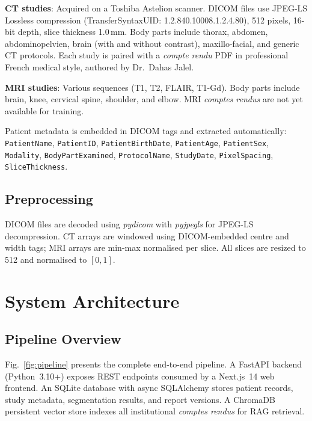 \documentclass[conference]{IEEEtran}
\begin{document}
\textbf{CT studies}: Acquired on a Toshiba Astelion scanner. DICOM files use
JPEG-LS Lossless compression (TransferSyntaxUID: 1.2.840.10008.1.2.4.80),
512 pixels, 16-bit depth, slice thickness 1.0\,mm. Body parts
include thorax, abdomen, abdominopelvien, brain (with and without contrast),
maxillo-facial, and generic CT protocols. Each study is paired with a
\textit{compte rendu} PDF in professional French medical style, authored by
Dr.~Dahas Jalel.

\textbf{MRI studies}: Various sequences (T1, T2, FLAIR, T1-Gd). Body parts
include brain, knee, cervical spine, shoulder, and elbow. MRI
\textit{comptes rendus} are not yet available for training.

Patient metadata is embedded in DICOM tags and extracted automatically:
\texttt{PatientName}, \texttt{PatientID}, \texttt{PatientBirthDate},
\texttt{PatientAge}, \texttt{PatientSex}, \texttt{Modality},
\texttt{BodyPartExamined}, \texttt{ProtocolName}, \texttt{StudyDate},
\texttt{PixelSpacing}, \texttt{SliceThickness}.

\subsection{Preprocessing}
DICOM files are decoded using \textit{pydicom} with \textit{pyjpegls} for
JPEG-LS decompression. CT arrays are windowed using DICOM-embedded centre and
width tags; MRI arrays are min-max normalised per slice. All slices are resized
to 512 and normalised to $[0, 1]$.

\section{System Architecture}

\subsection{Pipeline Overview}

Fig.~\ref{fig:pipeline} presents the complete end-to-end pipeline. A FastAPI
backend (Python~3.10+) exposes REST endpoints consumed by a Next.js~14
web frontend. An SQLite database with async SQLAlchemy stores patient records,
study metadata, segmentation results, and report versions. A ChromaDB
persistent vector store indexes all institutional \textit{comptes rendus} for
RAG retrieval.
\end{document}
